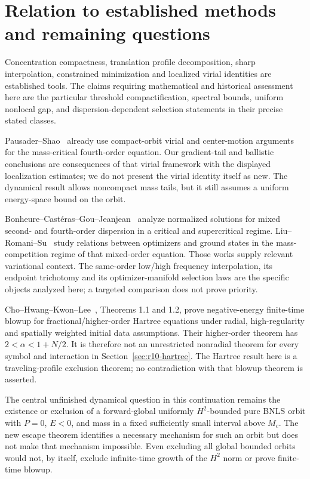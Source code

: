 \documentclass[11pt,a4paper]{article}
\theoremstyle{remark}\newtheorem{remark}[theorem]{Remark}
\begin{document}







\section{Relation to established methods and remaining questions}
Concentration compactness, translation profile decomposition, sharp
interpolation, constrained minimization and localized virial identities
are established tools. The claims requiring mathematical and historical
assessment here are the particular threshold compactification,
spectral bounds, uniform nonlocal gap, and dispersion-dependent
selection statements in their precise stated classes.

Pausader--Shao~\cite{PS} already use compact-orbit virial and center-motion
arguments for the mass-critical fourth-order equation. Our gradient-tail
and ballistic conclusions are consequences of that virial framework
with the displayed localization estimates; we do not present the virial
identity itself as new. The dynamical result allows noncompact mass
tails, but it still assumes a uniform energy-space bound on the orbit.

Bonheure--Cast\'eras--Gou--Jeanjean~\cite{BCGJ} analyze normalized
solutions for mixed second- and fourth-order dispersion in a critical
and supercritical regime. Liu--Romani--Su~\cite{LRS} study relations
between optimizers and ground states in the mass-competition regime
of that mixed-order equation. Those works supply relevant variational
context. The same-order low/high frequency interpolation, its endpoint
trichotomy and its optimizer-manifold selection laws are the specific
objects analyzed here; a targeted comparison does not prove priority.

Cho--Hwang--Kwon--Lee~\cite{CHKL}, Theorems 1.1 and 1.2, prove
negative-energy finite-time blowup for fractional/higher-order Hartree
equations under radial, high-regularity and spatially weighted initial
data assumptions. Their higher-order theorem has
$2<\alpha<1+N/2$. It is therefore not an unrestricted nonradial theorem
for every symbol and interaction in Section~\ref{sec:r10-hartree}.
The Hartree result here is a traveling-profile exclusion theorem; no
contradiction with that blowup theorem is asserted.

The central unfinished dynamical question in this continuation remains
the existence or exclusion of a forward-global uniformly $H^2$-bounded
pure BNLS orbit with $P=0$, $E<0$, and mass in a fixed sufficiently
small interval above $M_c$. The new escape theorem identifies a necessary
mechanism for such an orbit but does not make that mechanism impossible.
Even excluding all global bounded orbits would not, by itself, exclude
infinite-time growth of the $H^2$ norm or prove finite-time blowup.
\end{document}
